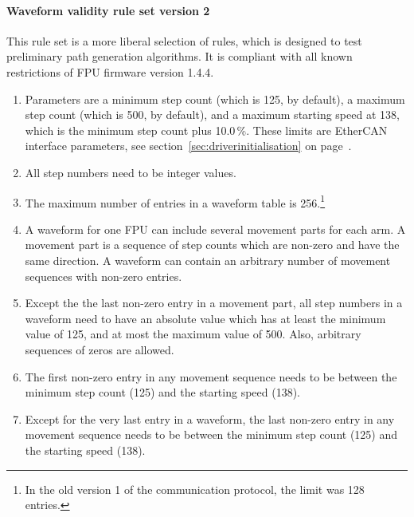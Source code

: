 \documentclass[fontsize=12,a4paper]{scrreprt}
\begin{document}
\paragraph{Waveform validity rule set version 2}

This rule set is a more liberal selection of rules, which is designed
to test preliminary path generation algorithms. It is compliant with
all known restrictions of FPU firmware version 1.4.4.

\begin{enumerate}
\item Parameters are a minimum step count (which is 125, by default),
  a maximum step count (which is 500, by default), and a maximum
  starting speed at 138, which is the minimum step count plus 10.0\,\%.  These
  limits are EtherCAN interface parameters, see
  section~\ref{sec:driverinitialisation} on
  page~\pageref{sec:driverinitialisation}.


\item All step numbers need to be integer values.

\item The maximum number of entries in a waveform table is
  256.\footnote{In the old version 1 of the communication
    protocol, the limit was 128 entries.}

\item A waveform for one FPU can include several movement parts for
  each arm. A movement part is a sequence of step counts which are
  non-zero and have the same direction.  A waveform can contain an
  arbitrary number of movement sequences with non-zero entries.


\item Except the the last non-zero entry in a movement part, all step
  numbers in a waveform need to have an absolute value which has at
  least the minimum value of 125, and at most the maximum value of
  500. Also, arbitrary sequences of zeros are allowed.

\item The first non-zero entry in any movement sequence needs to be
  between the minimum step count (125) and the starting speed (138).

\item Except for the very last entry in a waveform, the last non-zero
  entry in any movement sequence needs to be between the minimum step
  count (125) and the starting speed (138).


\end{enumerate}
\end{document}
